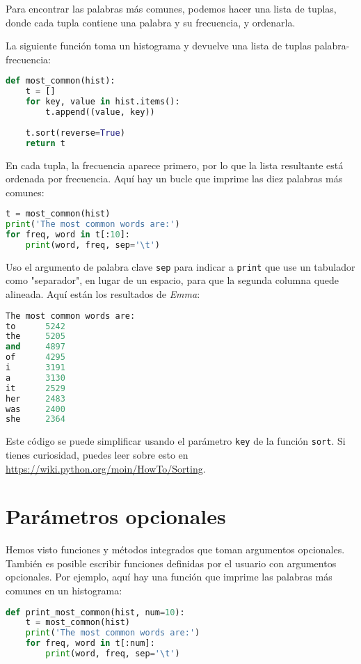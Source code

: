 Para encontrar las palabras más comunes, podemos hacer una lista de tuplas, donde cada tupla contiene una palabra y su frecuencia, y ordenarla.

La siguiente función toma un histograma y devuelve una lista de tuplas palabra-frecuencia:

\begin{lstlisting}[language=Python]
def most_common(hist):
    t = []
    for key, value in hist.items():
        t.append((value, key))
    
    t.sort(reverse=True)
    return t
\end{lstlisting}

En cada tupla, la frecuencia aparece primero, por lo que la lista resultante está ordenada por frecuencia. Aquí hay un bucle que imprime las diez palabras más comunes:

\begin{lstlisting}[language=Python]
t = most_common(hist)
print('The most common words are:')
for freq, word in t[:10]:
    print(word, freq, sep='\t')
\end{lstlisting}

Uso el argumento de palabra clave \texttt{sep} para indicar a \texttt{print} que use un tabulador como "separador", en lugar de un espacio, para que la segunda columna quede alineada. Aquí están los resultados de \textit{Emma}:

\begin{lstlisting}[language=Python]
The most common words are:
to      5242
the     5205
and     4897
of      4295
i       3191
a       3130
it      2529
her     2483
was     2400
she     2364
\end{lstlisting}

Este código se puede simplificar usando el parámetro \texttt{key} de la función \texttt{sort}. Si tienes curiosidad, puedes leer sobre esto en \url{https://wiki.python.org/moin/HowTo/Sorting}.

\section{Parámetros opcionales}

Hemos visto funciones y métodos integrados que toman argumentos opcionales. También es posible escribir funciones definidas por el usuario con argumentos opcionales. Por ejemplo, aquí hay una función que imprime las palabras más comunes en un histograma:

\begin{lstlisting}[language=Python]
def print_most_common(hist, num=10):
    t = most_common(hist)
    print('The most common words are:')
    for freq, word in t[:num]:
        print(word, freq, sep='\t')
\end{lstlisting}

